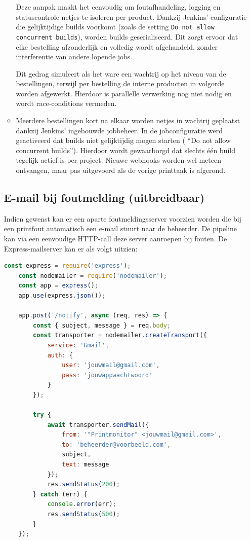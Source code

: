 \begin{enumerate}
\begin{itemize}
    Deze aanpak maakt het eenvoudig om foutafhandeling, logging en statuscontrole netjes te isoleren per product. Dankzij Jenkins' configuratie die gelijktijdige builds voorkomt (zoals de setting \texttt{Do not allow concurrent builds}), worden builds geserialiseerd. Dit zorgt ervoor dat elke bestelling afzonderlijk en volledig wordt afgehandeld, zonder interferentie van andere lopende jobs.
    
    Dit gedrag simuleert als het ware een wachtrij op het niveau van de bestellingen, terwijl per bestelling de interne producten in volgorde worden afgewerkt. Hierdoor is parallelle verwerking nog niet nodig en wordt race-conditions vermeden.
    
    
    \item Meerdere bestellingen kort na elkaar worden netjes in wachtrij geplaatst dankzij Jenkins' ingebouwde jobbeheer. In de jobconfiguratie werd geactiveerd dat builds niet gelijktijdig mogen starten ( “Do not allow concurrent builds”). Hierdoor wordt gewaarborgd dat slechts één build tegelijk actief is per project. Nieuwe webhooks worden wel meteen ontvangen, maar pas uitgevoerd als de vorige printtaak is afgerond.
\end{itemize}

\subsection{E-mail bij foutmelding (uitbreidbaar)}
Indien gewenst kan er een aparte foutmeldingsserver voorzien worden die bij een printfout automatisch een e-mail stuurt naar de beheerder. De pipeline kan via een eenvoudige HTTP-call deze server aanroepen bij fouten. De Express-mailserver kan er als volgt uitzien:

\begin{lstlisting}[language=javascript, caption=Express-server voor foutnotificatie per e-mail]
    const express = require('express');
    const nodemailer = require('nodemailer');
    const app = express();
    app.use(express.json());
    
    app.post('/notify', async (req, res) => {
        const { subject, message } = req.body;
        const transporter = nodemailer.createTransport({
            service: 'Gmail',
            auth: {
                user: 'jouwmail@gmail.com',
                pass: 'jouwappwachtwoord'
            }
        });
        
        try {
            await transporter.sendMail({
                from: '"Printmonitor" <jouwmail@gmail.com>',
                to: 'beheerder@voorbeeld.com',
                subject,
                text: message
            });
            res.sendStatus(200);
        } catch (err) {
            console.error(err);
            res.sendStatus(500);
        }
    });
    

\end{lstlisting}
\end{enumerate}

